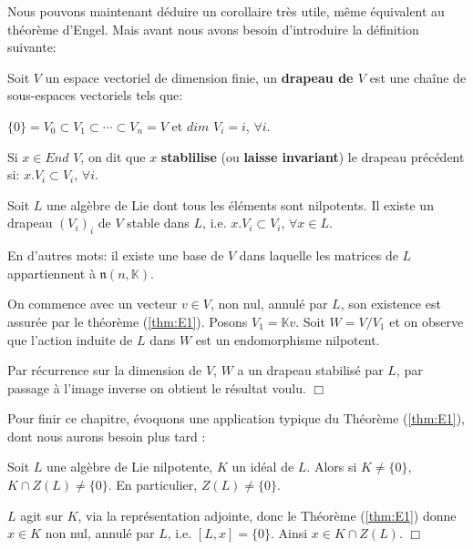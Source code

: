 \documentclass[a4paper,openany,12pt]{report}
\newcommand{\KK}{\mathbb{K}}
\newcommand{\nn}{\mathfrak{n}}
\theoremstyle{break}
{\theorembodyfont{\upshape}
\newtheorem*{rmq}{Remarque :}
\newtheorem*{prv}{Preuve :}
\newtheorem*{ex}{Exemples :}
\newtheorem*{exe}{Exemple : }
\newtheorem*{nota}{Notation :}
\newtheorem*{dem}{D\'emonstration :}}
\begin{document}
Nous pouvons maintenant déduire un corollaire très utile, même équivalent au théorème d'Engel. Mais avant nous avons besoin d'introduire la définition suivante:

\begin{df}
\quad Soit $V$ un espace vectoriel de dimension finie, un \textbf{drapeau de $V$} est une chaîne de sous-espaces vectoriels tels que:
\begin{center}
$\{0\} = V_{0} \subset V_{1} \subset \cdots \subset V_{n} = V$ et $dim$ $V_{i} = i$, $\forall i$.
\end{center} 

Si $x \in End$ $V$, on dit que $x$ \textbf{stablilise} (ou \textbf{laisse invariant}) le drapeau précédent si:
\center $x.V_{i} \subset V_{i}$, \quad $\forall i$.
\end{df}

\begin{cor}\label{cor:E1}
\quad Soit $L$ une algèbre de Lie dont tous les éléments sont nilpotents. Il existe un drapeau $(V_{i})_{i}$ de $V$ stable dans $L$, i.e. $x.V_{i} \subset V_{i}$, $\forall x \in L$. 

En d'autres mots: il existe une base de $V$ dans laquelle les matrices de $L$ appartiennent à $\nn(n,\KK)$.
\end{cor}

\begin{prv}
\quad On commence avec un vecteur $v \in V$, non nul, annulé par $L$, son existence est assurée par le théorème (\ref{thm:E1}). Posons $V_{1} = \KK v$. Soit $W= V/V_{1}$ et on observe que l'action induite de $L$ dans $W$ est un endomorphisme nilpotent.

Par récurrence sur la dimension de $V$, $W$ a un drapeau stabilisé par $L$, par passage à l'image inverse on obtient le résultat voulu. $\Box$
\end{prv}

Pour finir ce chapitre, évoquons une application  typique du Théorème (\ref{thm:E1}), dont nous aurons besoin plus tard : 

\begin{lem}\label{lem:E2}
\quad Soit $L$ une algèbre de Lie nilpotente, $K$ un idéal de $L$. Alors si $K \neq \{0\}$, $K \cap Z(L) \neq \{ 0 \}$.
En particulier, $Z(L) \neq \{ 0 \}$.
\end{lem}

\begin{prv}
\quad $L$ agit sur $K$, via la représentation adjointe, donc le Théorème (\ref{thm:E1}) donne $x \in K$ non nul, annulé par $L$, i.e. $[L,x]= \{0 \}$. Ainsi $x \in K \cap Z(L)$. $\Box$
\end{prv}
\end{document}
